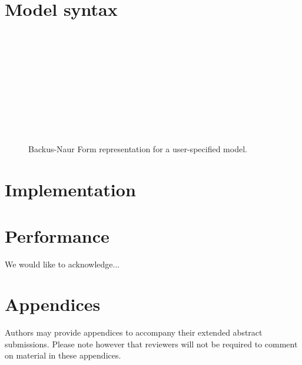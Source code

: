 \documentclass[anonymous=false, %
               format=acmsmall, %
               review=true, %
               screen=true, %
               nonacm=true]{acmart}
\begin{document}
\section{Model syntax}


\begin{figure}[!t]
  \centering
\begin{bnf*}
  \\
   \\
   \\ 
   \\
   \\
   \bnfsp {} \\
   \\
   \\ 
   \\
\end{bnf*}
  \caption{Backus-Naur Form representation for a user-specified model.}
  \label{fig:bnf}
\end{figure}

\section{Implementation}



\section{Performance}



\begin{acks}
We would like to acknowledge...
\end{acks}




\appendix

\section{Appendices}

Authors may provide appendices to accompany their extended abstract submissions. Please note however that reviewers will not be required to comment on material in these appendices.
\end{document}
